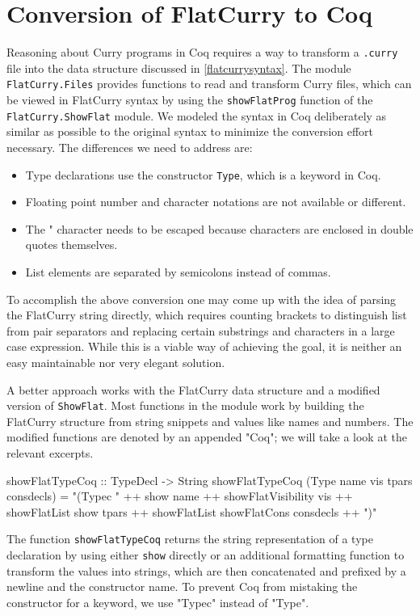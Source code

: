 \documentclass[paper = a4, fleqn, abstract=on, twoside]{scrreprt}
\newcommand{\coqinline}[1]{\texttt{#1}}
\begin{document}
\section{Conversion of FlatCurry to Coq}
\label{conversion}
Reasoning about Curry programs in Coq requires a way to transform a \texttt{.curry} file into the data structure discussed in \autoref{flatcurrysyntax}. The module \texttt{FlatCurry.Files} provides functions to read and transform Curry files, which can be viewed in FlatCurry syntax by using the \texttt{showFlatProg} function of the \texttt{FlatCurry.ShowFlat} module. We modeled the syntax in Coq deliberately as similar as possible to the original syntax to minimize the conversion effort necessary. The differences we need to address are:
\begin{itemize}
	\item Type declarations use the constructor \coqinline{Type}, which is a keyword in Coq.
	\item Floating point number and character notations are not available or different.
	\item The " character needs to be escaped because characters are enclosed in double quotes themselves.
	\item List elements are separated by semicolons instead of commas.
\end{itemize}
To accomplish the above conversion one may come up with the idea of parsing the FlatCurry string directly, which requires counting brackets to distinguish list from pair separators and replacing certain substrings and characters in a large case expression. While this is a viable way of achieving the goal, it is neither an easy maintainable nor very elegant solution.
\par
A better approach works with the FlatCurry data structure and a modified version of \texttt{ShowFlat}. Most functions in the module work by building the FlatCurry structure from string snippets and values like names and numbers. The modified functions are denoted by an appended "Coq"; we will take a look at the relevant excerpts.
\begin{haskellcode}
showFlatTypeCoq :: TypeDecl -> String
showFlatTypeCoq (Type name vis tpars consdecls) =
  "\n  (Typec " ++ show name ++ showFlatVisibility vis
                ++ showFlatList show tpars
                ++ showFlatList showFlatCons consdecls ++ ")"
\end{haskellcode}
The function \texttt{showFlatTypeCoq} returns the string representation of a type declaration by using either \texttt{show} directly or an additional formatting function to transform the values into strings, which are then concatenated and prefixed by a newline and the constructor name. To prevent Coq from mistaking the constructor for a keyword,  we use "Typec" instead of "Type".
\end{document}
